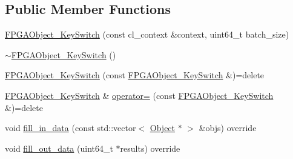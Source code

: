 \subsection*{Public Member Functions}
\begin{DoxyCompactItemize}
\item 
\hyperlink{structintel_1_1hexl_1_1fpga_1_1FPGAObject__KeySwitch_ae16a9ceae20ff53065758903c0798497}{F\-P\-G\-A\-Object\-\_\-\-Key\-Switch} (const cl\-\_\-context \&context, uint64\-\_\-t batch\-\_\-size)
\item 
\hyperlink{structintel_1_1hexl_1_1fpga_1_1FPGAObject__KeySwitch_ae2a3b0e0c4b18cf3c982eb9342b2a019}{$\sim$\-F\-P\-G\-A\-Object\-\_\-\-Key\-Switch} ()
\item 
\hyperlink{structintel_1_1hexl_1_1fpga_1_1FPGAObject__KeySwitch_a8b3920d9610a3d4ade501626f26a6bbb}{F\-P\-G\-A\-Object\-\_\-\-Key\-Switch} (const \hyperlink{structintel_1_1hexl_1_1fpga_1_1FPGAObject__KeySwitch}{F\-P\-G\-A\-Object\-\_\-\-Key\-Switch} \&)=delete
\item 
\hyperlink{structintel_1_1hexl_1_1fpga_1_1FPGAObject__KeySwitch}{F\-P\-G\-A\-Object\-\_\-\-Key\-Switch} \& \hyperlink{structintel_1_1hexl_1_1fpga_1_1FPGAObject__KeySwitch_a5579379c8ea215dc7843090c87277595}{operator=} (const \hyperlink{structintel_1_1hexl_1_1fpga_1_1FPGAObject__KeySwitch}{F\-P\-G\-A\-Object\-\_\-\-Key\-Switch} \&)=delete
\item 
void \hyperlink{structintel_1_1hexl_1_1fpga_1_1FPGAObject__KeySwitch_a55988d14e1056f130ad9a33ca9f7460d}{fill\-\_\-in\-\_\-data} (const std\-::vector$<$ \hyperlink{structintel_1_1hexl_1_1fpga_1_1Object}{Object} $\ast$ $>$ \&objs) override
\item 
void \hyperlink{structintel_1_1hexl_1_1fpga_1_1FPGAObject__KeySwitch_a3e2a88df5541b000ef61d82c65c2e26b}{fill\-\_\-out\-\_\-data} (uint64\-\_\-t $\ast$results) override
\end{DoxyCompactItemize}
